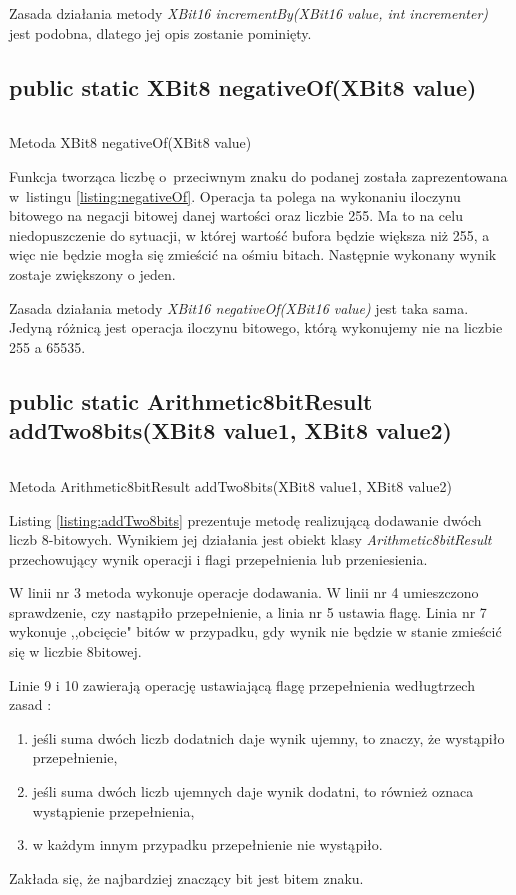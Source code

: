Zasada działania metody \emph{XBit16 incrementBy(XBit16 value, int incrementer)} jest podobna, dlatego jej opis zostanie pominięty. 

\subsection{public static XBit8 negativeOf(XBit8 value)}
\begin{listing}[h]
	\inputminted{java}{listings/xbit/negativeOf.java}
	\caption{Metoda XBit8 negativeOf(XBit8 value)}
	\label{listing:negativeOf}
\end{listing}
Funkcja tworząca liczbę o~przeciwnym znaku do podanej została zaprezentowana w~listingu \ref{listing:negativeOf}. Operacja ta polega na wykonaniu iloczynu bitowego na negacji bitowej danej wartości oraz liczbie 255. Ma to na celu niedopuszczenie do sytuacji, w której wartość bufora będzie większa niż 255, a więc nie będzie mogła się zmieścić na ośmiu bitach.
Następnie wykonany wynik zostaje zwiększony o jeden. 

Zasada działania metody \emph{XBit16 negativeOf(XBit16 value)} jest taka sama. Jedyną różnicą jest operacja iloczynu bitowego, którą wykonujemy nie na liczbie 255 a 65535.

\subsection{public static Arithmetic8bitResult addTwo8bits(XBit8 value1, XBit8 value2)}
\begin{listing}[h]
	\inputminted{java}{listings/xbit/addTwo8bits.java}
	\caption{Metoda Arithmetic8bitResult addTwo8bits(XBit8 value1, XBit8 value2)}
	\label{listing:addTwo8bits}
\end{listing}
Listing \ref{listing:addTwo8bits} prezentuje metodę realizującą dodawanie dwóch liczb 8-bitowych. Wynikiem jej działania jest obiekt klasy \emph{Arithmetic8bitResult} przechowujący wynik operacji i flagi przepełnienia lub przeniesienia. 

W linii nr 3 metoda wykonuje operacje dodawania. W linii nr 4 umieszczono sprawdzenie, czy nastąpiło przepełnienie, a linia nr 5 ustawia flagę. Linia nr 7 wykonuje ,,obcięcie" bitów w przypadku, gdy wynik nie będzie w stanie zmieścić się w liczbie 8{\dywiz}bitowej.

Linie 9 i 10 zawierają operację ustawiającą flagę przepełnienia według\newline trzech zasad \cite{overflowRules}:
\begin{enumerate}
	\item jeśli suma dwóch liczb dodatnich daje wynik ujemny, to znaczy, że wystąpiło przepełnienie,
	\item jeśli suma dwóch liczb ujemnych daje wynik dodatni, to również oznaca wystąpienie przepełnienia,
	\item w każdym innym przypadku przepełnienie nie wystąpiło.
\end{enumerate}
Zakłada się, że najbardziej znaczący bit jest bitem znaku.

